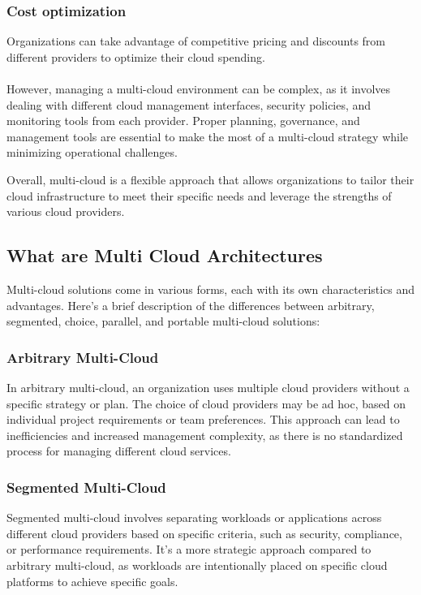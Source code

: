 \subsubsection{Cost optimization}
Organizations can take advantage of competitive pricing and 
discounts from different providers to optimize their cloud spending.\\
\\

However, managing a multi-cloud environment can be complex, as it involves dealing with different cloud management
interfaces, security policies, and monitoring tools from each provider. Proper planning, governance, and management tools are 
essential to make the most of a multi-cloud strategy while minimizing operational challenges.

Overall, multi-cloud is a flexible approach that allows organizations to tailor their cloud infrastructure to meet 
their specific needs and leverage the strengths of various cloud providers.

\subsection{What are Multi Cloud Architectures}


Multi-cloud solutions come in various forms, each with its own characteristics and advantages. 
Here's a brief description of the differences between arbitrary, segmented, choice, parallel, and portable multi-cloud solutions:

\subsubsection{Arbitrary Multi-Cloud}
In arbitrary multi-cloud, an organization uses multiple cloud providers without a specific strategy or plan.
The choice of cloud providers may be ad hoc, based on individual project requirements or team preferences.
This approach can lead to inefficiencies and increased management complexity, as there is no standardized process for managing different cloud services.

\subsubsection{Segmented Multi-Cloud}
Segmented multi-cloud involves separating workloads or applications across different cloud providers based on specific criteria, such as security, compliance, or performance requirements.
It's a more strategic approach compared to arbitrary multi-cloud, as workloads are intentionally placed on specific cloud platforms to achieve specific goals.

